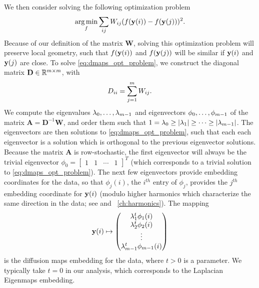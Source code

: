 We then consider solving the following optimization problem \citep{Belkin2003}
\begin{equation} \label{eq:dmaps_opt_problem}
\operatorname*{arg\,min}_{f} \sum_{ij} W_{ij} (f(\mathbf{y}(i)) - f(\mathbf{y}(j)))^2.
\end{equation}
%
Because of our definition of the matrix $\mathbf{W}$, solving this optimization problem will preserve local geometry, such that $f(\mathbf{y}(i))$ and $f(\mathbf{y}(j))$ will be similar if $\mathbf{y}(i)$ and $\mathbf{y}(j)$ are close. 
%
To solve \eqref{eq:dmaps_opt_problem}, we construct the diagonal matrix $\mathbf{D} \in \mathbb{R}^{m \times m}$, with
\begin{equation}
D_{ii} = \sum_{j=1}^m W_{ij}.
\end{equation}
%
We compute the eigenvalues $\lambda_0, \dots, \lambda_{m-1}$ and eigenvectors $\phi_0, \dots, \phi_{m-1}$ of the matrix $\mathbf{A} = \mathbf{D}^{-1}\mathbf{W}$, and order them such that $1 = \lambda_0 \ge |\lambda_1| \ge \dots \ge |\lambda_{m-1}|$.
%
The eigenvectors are then solutions to \eqref{eq:dmaps_opt_problem}, such that each each eigenvector is a solution which is orthogonal to the previous eigenvector solutions. 
%
Because the matrix $\mathbf{A}$ is row-stochastic, the first eigenvector will always be the trivial eigenvector $\phi_0 = \begin{bmatrix} 1 & 1 & \cdots & 1 \end{bmatrix}^T$ (which corresponds to a trivial solution to \eqref{eq:dmaps_opt_problem}).
%
The next few eigenvectors provide embedding coordinates for the data, so that $\phi_j(i)$, the $i^{th}$ entry of $\phi_j$, provides the $j^{th}$ embedding coordinate for $\mathbf{y}(i)$ (modulo higher harmonics which characterize
the same direction in the data; see \cite{ferguson2010systematic} and \chap~\ref{ch:harmonics}).
%
The mapping
\begin{equation} \label{eq:dmaps_embed_full}
\mathbf{y}(i) \mapsto 
\begin{pmatrix}
\lambda_1^t \phi_1(i) \\
\lambda_2^t \phi_2(i) \\
\vdots \\
\lambda_{m-1}^t  \phi_{m-1}(i)
\end{pmatrix}
\end{equation}
is the diffusion maps embedding for the data, where $t > 0$ is a parameter.
%
We typically take $t=0$ in our analysis, which corresponds to the Laplacian Eigenmaps embedding.  
